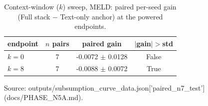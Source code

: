 \begin{table}[t]
\centering
\caption{Context-window ($k$) sweep, MELD: paired per-seed gain (Full stack $-$ Text-only anchor) at the powered endpoints.}
\label{tab:k-sweep-endpoints}
\begin{tabular}{lccc}
\toprule
endpoint & $n$ pairs & paired gain & $|$gain$|>$std \\
\midrule
$k=0$ & 7 & -0.0072 $\pm$ 0.0128 & False \\
$k=8$ & 7 & -0.0088 $\pm$ 0.0072 & True \\
\bottomrule
\end{tabular}
\par\footnotesize Source: outputs/subsumption\_curve\_data.json['paired\_n7\_test'] (docs/PHASE\_N5A.md).
\end{table}

